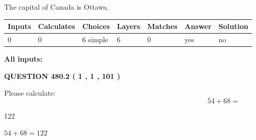 \documentclass[12pt]{article}
\begin{document}
 
\noindent{}
 
 
The capital of Canada is Ottawa.
 
 
\noindent{}
 
 
   
   
   
   
\noindent\begin{tabular}{|l|l|l|l|l|l|l|}
 \hline
Inputs & Calculates & Choices & Layers & Matches & Answer & Solution \\ \hline
 0  & 
 0  & 
 6
  simple  
  & 
 6  & 
 0  & 
  yes & 
  no 
  \\ \hline
 \end{tabular}
   
   
   
   
\noindent{}
   
   
   
   
\noindent\vspace{0.1in}\hspace{-0.08in} {\textbf{\Large{All inputs: }}}
   
   
  
\vspace{0.2in}
  
{\textbf{\Large{QUESTION
480.2 
 ( 1 , 1 , 101 )
}}}
  
  
 
Please calculate:
\begin{equation}
54 +  %
68 = \nonumber
\end{equation}
 
 
 
\noindent{}
 
 

122
 
 
\noindent{}
 
 

 
 
 
\noindent{}
 
 

$ %
54 +  %
68=   %
122$
 
\end{document}
